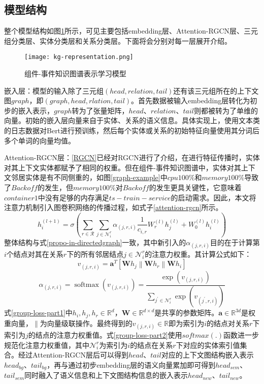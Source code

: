 \subsection{模型结构}
整个模型结构如图\ref{kg-representation}所示，可见主要包括embedding层、Attention-RGCN层、三元组分类层、实体分类层和关系分类层。下面将会分别对每一层展开介绍。
\begin{figure}[htbp]
    \centering
    \texttt{[image: kg-representation.png]}
    \caption{组件-事件知识图谱表示学习模型\label{kg-representation}}
\end{figure}

嵌入层：模型的输入除了三元组$(head, relation, tail)$还有该三元组所在的上下文图$graph$，即$(graph, head,rlation,tail)$。首先数据被输入embedding层转化为初步的嵌入表示，$graph$转为了张量矩阵，$head$、$relation$、$tail$则都被转为了单维的向量。初始的嵌入层向量来自于实体、关系的语义信息。具体实现上，使用文本类的日志数据对Bert\cite{devlin2018bert}进行预训练，然后每个实体或关系的初始特征向量使用其分词后多个单词的向量均值。

Attention-RGCN层：\ref{RGCN}已经对RGCN进行了介绍，在进行特征传播时，实体对其上下文实体都赋予了相同的权重。但在组件-事件知识图谱中，实体对其上下文邻居实体是有不同侧重的，如图\ref{graph-example}中$cpu 100\%$和$memory 100\%$导致了$Backoff$的发生，但$memory 100\%$对$Backoff$的发生更具关键性，它意味着$container1$中没有足够的内存满足$ts-train-service$的启动需求。因此，本文将注意力机制引入图卷积网络的传播过程，如式子\ref{attention-rgcn}所示。
\begin{equation}
    h_{i}^{(l+1)}=\sigma\left(\sum_{r \in \mathcal{R}} \sum_{j \in \mathcal{N}_{i}^{r}} \alpha_{(j, r, i)} \frac{1}{c_{i, r}} W_{r}^{(l)} h_{j}^{(l)}+W_{0}^{(l)} h_{i}^{(l)}\right)
    \label{attention-rgcn}
\end{equation}
整体结构与式\ref{propo-in-directedgraph}一致，其中新引入的$\alpha_{(j, r, i)}$目的在于计算第$i$个结点对其在关系$r$下的所有邻居结点$j \in \mathcal{N}_{i}^{r}$的注意力权重。其计算公式如下：
\begin{equation}
    v_{(j, r, i)}=\mathbf{a}^{T}\left[\mathbf{W} h_{j}\left\|\mathbf{W} h_{r}\right\| \mathbf{W} h_{i}\right]
    \label{group-loss-part1}
\end{equation}
\begin{equation}
    \alpha_{(j, r, i)}=\operatorname{softmax}\left(v_{(j, r, i)}\right)=\frac{\exp \left(v_{(j, r, i)}\right)}{\sum_{j^{\prime} \in \mathcal{N}_{i}^{r}} \exp \left(v_{\left(j^{\prime}, r, i\right)}\right)}
    \label{group-loss-part2}
\end{equation}
式\ref{group-loss-part1}中$h_i,h_j,h_r\in\mathbb{R}^{d}$，$\mathbf{W} \in \mathbb{R}^{d\times d}$是共享的参数矩阵。$\mathbf{a} \in \mathbb{R}^{3 d}$是权重向量，$\|$为向量级联操作。最终得到的$ v_{(j, r, i)} \in \mathbb{R}$即为索引为$i$的结点对关系$r$下索引为$j$的结点的注意力权重值。式\ref{group-loss-part2}使用$softmax(.)$函数进一步规范化注意力权重值，其中$\mathcal{N}_{i}^{r}$为索引为$i$的结点在关系$r$下对应的实体索引值集合。经过Attention-RGCN层后可以得到$head$、$tail$对应的上下文图结构嵌入表示$head_{bg}$、$tail_{bg}$，再与通过初步embedding层的语义向量累加即可得到$head_{sem}$、$tail_{sem}$同时融入了语义信息和上下文图结构信息的嵌入表示$head_{new}$、$tail_{new}$。

